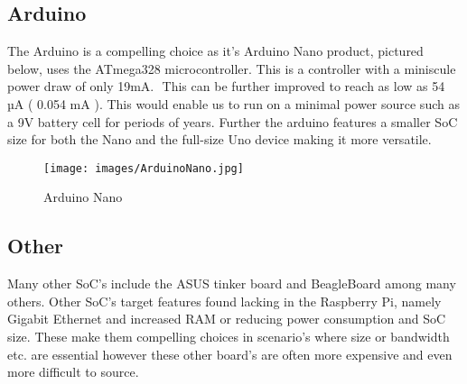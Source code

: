 \subsection{Arduino}
The Arduino is a compelling choice as it’s Arduino Nano product, pictured below, uses the ATmega328 microcontroller. This is a controller with a miniscule power draw of only 19mA. \citep{ArduinoLLC2010}⁠ This can be further improved to reach as low as 54 µA ( 0.054 mA ). This would enable us to run on a minimal power source such as a 9V battery cell for periods of years. \citep{Madcoffee2018} Further the arduino features a smaller SoC size for both the Nano and the full-size Uno device \citep{ArduinoLLC2010} making it more versatile.

\begin{figure}[H]
	\centering
	\texttt{[image: images/ArduinoNano.jpg]}
	\caption{ Arduino Nano \citep{Mellis2010}}
	\label{fig:nano}
\end{figure}

\subsection{Other}
Many other SoC’s include the ASUS tinker board and BeagleBoard among many others. Other SoC's target features found lacking in the Raspberry Pi, namely Gigabit Ethernet and increased RAM or reducing power consumption and SoC size. These make them compelling choices in scenario's where size or bandwidth etc. are essential however these other board's are often more expensive and even more difficult to source.

